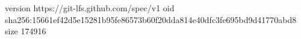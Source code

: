 version https://git-lfs.github.com/spec/v1
oid sha256:15661ef42d5e15281b95fe86573b60f20dda814e40dfc3fe695bd9d41770abd8
size 174916
